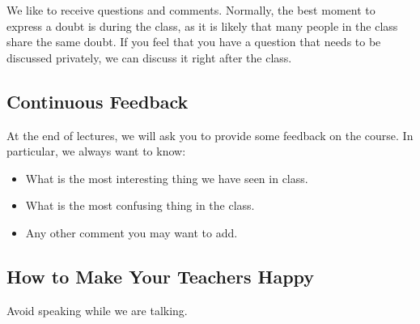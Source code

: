 We like to receive questions and comments. Normally, the best moment to express a doubt is during the class, as it is likely that many people in the class share the same doubt. If you feel that you have a question that needs to be discussed privately, we can discuss it right after the class.

\subsection{Continuous Feedback}

At the end of lectures, we will ask you to provide some feedback on the course. In particular, we always want to know:
\begin{itemize}
\item What is the most interesting thing we have seen in class.
\item What is the most confusing thing in the class.
\item Any other comment you may want to add.

\end{itemize}

\subsection{How to Make Your Teachers Happy}

Avoid speaking while we are talking.
